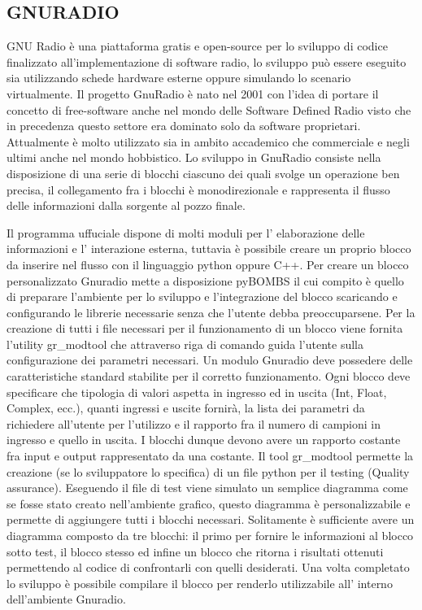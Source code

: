 \begin{itemize}
\chapter{GNURADIO}
GNU Radio è una piattaforma gratis e open-source per lo sviluppo di codice finalizzato all'implementazione di software radio, lo sviluppo può essere eseguito sia utilizzando schede hardware esterne oppure simulando lo scenario virtualmente. Il progetto GnuRadio è nato nel 2001 con l'idea di portare il concetto di free-software anche nel mondo delle Software Defined Radio visto che in precedenza questo settore era dominato solo da software proprietari. Attualmente è molto utilizzato sia in ambito accademico che commerciale e negli ultimi anche nel mondo hobbistico. Lo sviluppo in GnuRadio consiste nella disposizione di una serie di blocchi ciascuno dei quali svolge un operazione ben precisa, il collegamento fra i blocchi è monodirezionale e rappresenta il flusso delle informazioni dalla sorgente al pozzo finale.

 Il programma uffuciale dispone di molti moduli per l' elaborazione delle informazioni e l' interazione esterna, tuttavia è possibile creare un proprio blocco da inserire nel flusso con il linguaggio python oppure C++. Per creare un blocco personalizzato Gnuradio mette a disposizione pyBOMBS il cui compito è quello di preparare l'ambiente per lo sviluppo e l'integrazione del blocco scaricando e configurando le librerie necessarie senza che l'utente debba preoccuparsene.
 Per la creazione di tutti i file necessari per il funzionamento di un blocco viene fornita l'utility gr\_modtool che attraverso riga di comando guida l'utente sulla configurazione dei parametri necessari. Un modulo Gnuradio deve possedere delle caratteristiche standard stabilite per il corretto funzionamento. Ogni blocco deve specificare che tipologia di valori aspetta in ingresso ed in uscita (Int, Float, Complex, ecc.), quanti ingressi e uscite fornirà, la lista dei parametri da richiedere all'utente per l'utilizzo e il rapporto fra il numero di campioni in ingresso e quello in uscita. I blocchi dunque devono avere un rapporto costante fra input e output rappresentato da una costante. Il tool gr\_modtool permette la creazione (se lo sviluppatore lo specifica) di un file python per il testing (Quality assurance). Eseguendo il file di test viene simulato un semplice diagramma come se fosse stato creato nell'ambiente grafico, questo diagramma è personalizzabile e permette di aggiungere tutti i blocchi necessari. Solitamente è sufficiente avere un diagramma composto da tre blocchi: il primo per fornire le informazioni al blocco sotto test, il blocco stesso ed infine un blocco che ritorna i risultati ottenuti permettendo al codice di confrontarli con quelli desiderati.
 Una volta completato lo sviluppo è possibile compilare il blocco per renderlo utilizzabile all' interno dell'ambiente Gnuradio.


\end{itemize}
